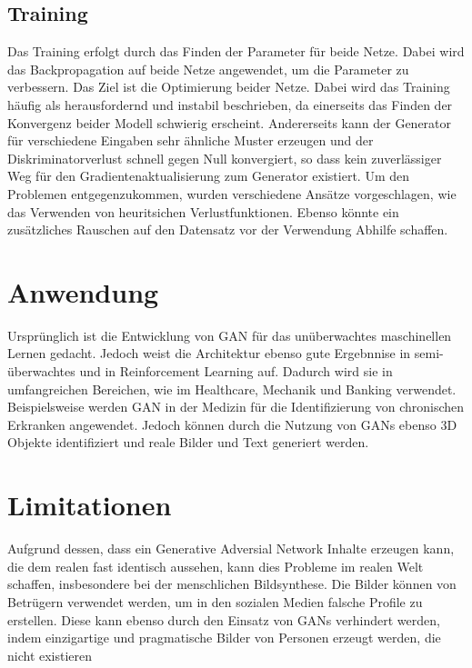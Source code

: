 \subsection*{Training}
Das Training erfolgt durch das Finden der Parameter für beide Netze. Dabei wird das Backpropagation auf beide Netze angewendet, um die Parameter zu verbessern. Das Ziel ist die Optimierung beider Netze. Dabei wird das Training häufig als herausfordernd und instabil beschrieben, da einerseits das Finden der Konvergenz beider Modell schwierig erscheint. Andererseits kann der Generator für verschiedene Eingaben sehr ähnliche Muster erzeugen und der Diskriminatorverlust schnell gegen Null konvergiert, so dass kein zuverlässiger Weg für den Gradientenaktualisierung zum Generator existiert. 
Um den Problemen entgegenzukommen, wurden verschiedene Ansätze vorgeschlagen, wie das Verwenden von heuritsichen Verlustfunktionen. Ebenso könnte ein zusätzliches Rauschen auf den Datensatz vor der Verwendung Abhilfe schaffen.

\section*{Anwendung}
Ursprünglich ist die Entwicklung von GAN für das unüberwachtes maschinellen Lernen gedacht. Jedoch weist die Architektur ebenso gute Ergebnnise in semi-überwachtes und in Reinforcement Learning auf. 
Dadurch wird sie in umfangreichen Bereichen, wie im Healthcare, Mechanik und Banking verwendet. Beispielsweise werden GAN in der Medizin für die Identifizierung von chronischen Erkranken angewendet. Jedoch können durch die Nutzung von GANs ebenso 3D Objekte identifiziert und reale Bilder und Text generiert werden.

\section*{Limitationen}
Aufgrund dessen, dass ein Generative Adversial Network Inhalte erzeugen kann, die dem realen fast identisch aussehen, kann dies Probleme im realen Welt schaffen, insbesondere bei der menschlichen Bildsynthese. Die Bilder können von Betrügern verwendet werden, um in den sozialen Medien falsche Profile zu erstellen. 
Diese kann ebenso durch den Einsatz von GANs verhindert werden, indem einzigartige und pragmatische Bilder von Personen erzeugt werden, die nicht existieren